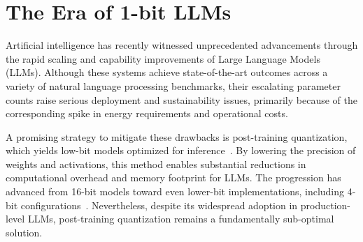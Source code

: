 \begin{abstract}
Groundbreaking studies, including BitNet~\cite{bitnet}, are ushering in a transformative era centered on 1-bit Large Language Models (LLMs). In this paper, we present a ternary LLM variant named \textbf{}, wherein every parameter (or weight) adopts a value from the set \{-1, 0, 1\}. This approach delivers performance on par with standard full-precision (such as FP16 or BF16) Transformer-based LLMs with identical architectural size and training data volume, achieving comparable results in perplexity and downstream tasks. Additionally, BitNet b1.58 offers pronounced benefits regarding memory efficiency, reduced latency, improved throughput, and lower energy usage. Of particular significance, this 1.58-bit LLM establishes an innovative scaling law and formulates training methodologies for future LLMs that combine robust performance with enhanced efficiency. The resulting architecture also suggests a novel computational paradigm, paving the way for hardware tailored specifically for 1-bit LLMs.
\end{abstract}

\section{The Era of 1-bit LLMs}

Artificial intelligence has recently witnessed unprecedented advancements through the rapid scaling and capability improvements of Large Language Models (LLMs). Although these systems achieve state-of-the-art outcomes across a variety of natural language processing benchmarks, their escalating parameter counts raise serious deployment and sustainability issues, primarily because of the corresponding spike in energy requirements and operational costs.

A promising strategy to mitigate these drawbacks is post-training quantization, which yields low-bit models optimized for inference~\cite{smoothquant, gptq, quip, quip_sharp}. By lowering the precision of weights and activations, this method enables substantial reductions in computational overhead and memory footprint for LLMs. The progression has advanced from 16-bit models toward even lower-bit implementations, including 4-bit configurations~\cite{gptq, awq}. Nevertheless, despite its widespread adoption in production-level LLMs, post-training quantization remains a fundamentally sub-optimal solution.

